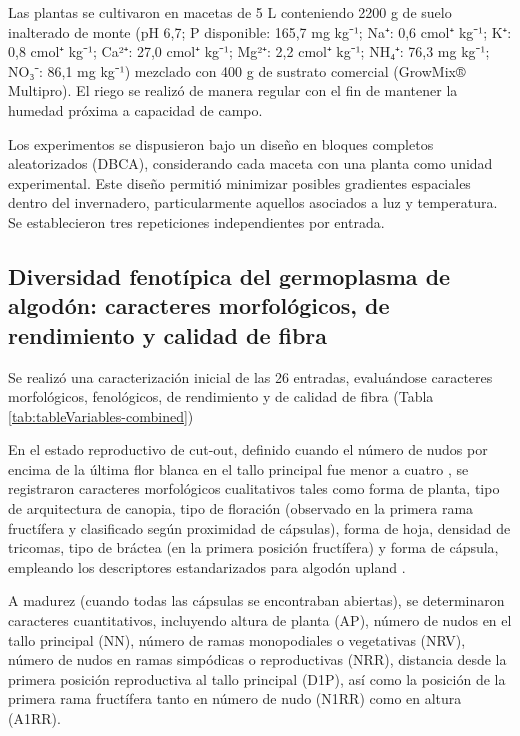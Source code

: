 \documentclass[12pt,oneside]{reedthesis}
\begin{document}
Las plantas se cultivaron en macetas de 5 L conteniendo 2200 g de suelo inalterado de monte (pH 6,7; P disponible: 165,7 mg kg⁻¹; Na⁺: 0,6 cmol⁺ kg⁻¹; K⁺: 0,8 cmol⁺ kg⁻¹; Ca²⁺: 27,0 cmol⁺ kg⁻¹; Mg²⁺: 2,2 cmol⁺ kg⁻¹; NH₄⁺: 76,3 mg kg⁻¹; NO₃⁻: 86,1 mg kg⁻¹) mezclado con 400 g de sustrato comercial (GrowMix® Multipro). El riego se realizó de manera regular con el fin de mantener la humedad próxima a capacidad de campo.

Los experimentos se dispusieron bajo un diseño en bloques completos aleatorizados (DBCA), considerando cada maceta con una planta como unidad experimental. Este diseño permitió minimizar posibles gradientes espaciales dentro del invernadero, particularmente aquellos asociados a luz y temperatura. Se establecieron tres repeticiones independientes por entrada.

\subsection{Diversidad fenotípica del germoplasma de algodón: caracteres morfológicos, de rendimiento y calidad de fibra}\label{diversidad-fenotuxedpica-del-germoplasma-de-algoduxf3n-caracteres-morfoluxf3gicos-de-rendimiento-y-calidad-de-fibra}

Se realizó una caracterización inicial de las 26 entradas, evaluándose caracteres morfológicos, fenológicos, de rendimiento y de calidad de fibra (Tabla \ref{tab:tableVariables-combined})

En el estado reproductivo de cut-out, definido cuando el número de nudos por encima de la última flor blanca en el tallo principal fue menor a cuatro \autocite{bourland1992}, se registraron caracteres morfológicos cualitativos tales como forma de planta, tipo de arquitectura de canopia, tipo de floración (observado en la primera rama fructífera y clasificado según proximidad de cápsulas), forma de hoja, densidad de tricomas, tipo de bráctea (en la primera posición fructífera) y forma de cápsula, empleando los descriptores estandarizados para algodón upland \autocite{upov2018,yu2026}.

A madurez (cuando todas las cápsulas se encontraban abiertas), se determinaron caracteres cuantitativos, incluyendo altura de planta (AP), número de nudos en el tallo principal (NN), número de ramas monopodiales o vegetativas (NRV), número de nudos en ramas simpódicas o reproductivas (NRR), distancia desde la primera posición reproductiva al tallo principal (D1P), así como la posición de la primera rama fructífera tanto en número de nudo (N1RR) como en altura (A1RR).
\end{document}
